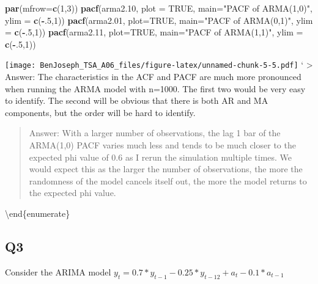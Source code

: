 \documentclass[
]{article}
\newenvironment{Shaded}{\begin{snugshade}}{\end{snugshade}}
\newcommand{\DataTypeTok}[1]{\textcolor[rgb]{0.13,0.29,0.53}{#1}}
\newcommand{\DecValTok}[1]{\textcolor[rgb]{0.00,0.00,0.81}{#1}}
\newcommand{\FloatTok}[1]{\textcolor[rgb]{0.00,0.00,0.81}{#1}}
\newcommand{\KeywordTok}[1]{\textcolor[rgb]{0.13,0.29,0.53}{\textbf{#1}}}
\newcommand{\NormalTok}[1]{#1}
\newcommand{\OperatorTok}[1]{\textcolor[rgb]{0.81,0.36,0.00}{\textbf{#1}}}
\newcommand{\OtherTok}[1]{\textcolor[rgb]{0.56,0.35,0.01}{#1}}
\newcommand{\StringTok}[1]{\textcolor[rgb]{0.31,0.60,0.02}{#1}}
\begin{document}
\begin{Shaded}
\begin{Highlighting}[]
\KeywordTok{par}\NormalTok{(}\DataTypeTok{mfrow=}\KeywordTok{c}\NormalTok{(}\DecValTok{1}\NormalTok{,}\DecValTok{3}\NormalTok{))}
\KeywordTok{pacf}\NormalTok{(arma2}\FloatTok{.10}\NormalTok{, }\DataTypeTok{plot =} \OtherTok{TRUE}\NormalTok{, }\DataTypeTok{main=}\StringTok{"PACF of ARMA(1,0)"}\NormalTok{, }\DataTypeTok{ylim =} \KeywordTok{c}\NormalTok{(}\OperatorTok{-}\NormalTok{.}\DecValTok{5}\NormalTok{,}\DecValTok{1}\NormalTok{))}
\KeywordTok{pacf}\NormalTok{(arma2}\FloatTok{.01}\NormalTok{, }\DataTypeTok{plot=}\OtherTok{TRUE}\NormalTok{, }\DataTypeTok{main=}\StringTok{"PACF of ARMA(0,1)"}\NormalTok{, }\DataTypeTok{ylim =} \KeywordTok{c}\NormalTok{(}\OperatorTok{-}\NormalTok{.}\DecValTok{5}\NormalTok{,}\DecValTok{1}\NormalTok{))}
\KeywordTok{pacf}\NormalTok{(arma2}\FloatTok{.11}\NormalTok{, }\DataTypeTok{plot=}\OtherTok{TRUE}\NormalTok{, }\DataTypeTok{main=}\StringTok{"PACF of ARMA(1,1)"}\NormalTok{, }\DataTypeTok{ylim =} \KeywordTok{c}\NormalTok{(}\OperatorTok{-}\NormalTok{.}\DecValTok{5}\NormalTok{,}\DecValTok{1}\NormalTok{))}
\end{Highlighting}
\end{Shaded}

\texttt{[image: BenJoseph\_TSA\_A06\_files/figure-latex/unnamed-chunk-5-5.pdf]}
` \textgreater{} Answer: The characteristics in the ACF and PACF are
much more pronounced when running the ARMA model with n=1000. The first
two would be very easy to identify. The second will be obvious that
there is both AR and MA components, but the order will be hard to
identify.

\begin{quote}
Answer: With a larger number of observations, the lag 1 bar of the
ARMA(1,0) PACF varies much less and tends to be much closer to the
expected phi value of 0.6 as I rerun the simulation multiple times. We
would expect this as the larger the number of observations, the more the
randomness of the model cancels itself out, the more the model returns
to the expected phi value.
\end{quote}

\textbackslash end\{enumerate\}

\hypertarget{q3}{%
\subsection{Q3}\label{q3}}

Consider the ARIMA model
\(y_t=0.7*y_{t-1}-0.25*y_{t-12}+a_t-0.1*a_{t-1}\)
\end{document}
